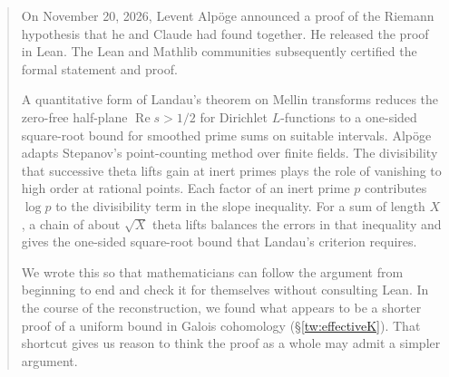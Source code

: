 \begin{abstract}
On November 20, 2026, Levent Alp\"oge announced a proof of the Riemann hypothesis that he and Claude had found together. He released the proof in Lean. The Lean and Mathlib communities subsequently certified the formal statement and proof.

A quantitative form of Landau's theorem on Mellin transforms reduces the zero-free half-plane $\operatorname{Re}s>1/2$ for Dirichlet $L$-functions to a one-sided square-root bound for smoothed prime sums on suitable intervals. Alp\"oge adapts Stepanov's point-counting method over finite fields. The divisibility that successive theta lifts gain at inert primes plays the role of vanishing to high order at rational points. Each factor of an inert prime $p$ contributes $\log p$ to the divisibility term in the slope inequality. For a sum of length $X$, a chain of about $\sqrt X$ theta lifts balances the errors in that inequality and gives the one-sided square-root bound that Landau's criterion requires.

We wrote this so that mathematicians can follow the argument from beginning to end and check it for themselves without consulting Lean. In the course of the reconstruction, we found what appears to be a shorter proof of a uniform bound in Galois cohomology (\S\ref{tw:effectiveK}). That shortcut gives us reason to think the proof as a whole may admit a simpler argument.
\end{abstract}

